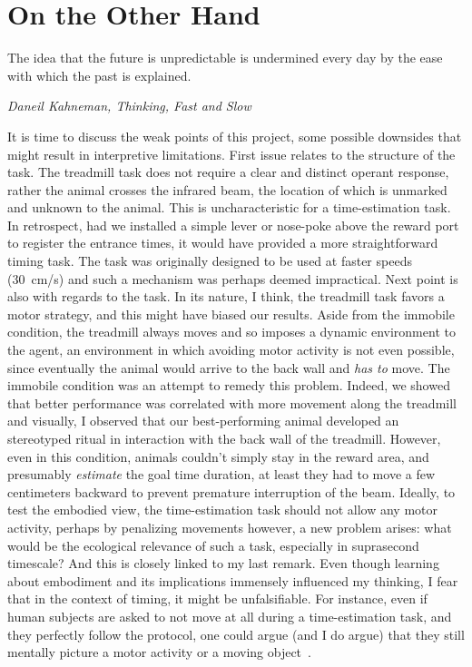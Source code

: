 \section{On the Other Hand}
{\singlespacing \epigraph{The idea that the future is unpredictable is undermined every day by the ease with which the past is explained.}
{\textit{Daneil Kahneman, Thinking, Fast and Slow}}}
\noindent
It is time to discuss the weak points of this project, some possible downsides that might result in interpretive limitations.
First issue relates to the structure of the task.
The treadmill task does not require a clear and distinct operant response, rather the animal crosses the infrared beam, the location of which is unmarked and unknown to the animal.
This is uncharacteristic for a time-estimation task.
In retrospect, had we installed a simple lever or nose-poke above the reward port to register the entrance times, it would have provided a more straightforward timing task.
The task was originally designed to be used at faster speeds (30~cm/s) and such a mechanism was perhaps deemed impractical.
Next point is also with regards to the task.
In its nature, I think, the treadmill task favors a motor strategy, and this might have biased our results.
Aside from the immobile condition, the treadmill always moves and so imposes a dynamic environment to the agent, an environment in which avoiding motor activity is not even possible, since eventually the animal would arrive to the back wall and \textit{has to} move.
The immobile condition was an attempt to remedy this problem.
Indeed, we showed that better performance was correlated with more movement along the treadmill and visually, I observed that our best-performing animal developed an stereotyped ritual in interaction with the back wall of the treadmill.
However, even in this condition, animals couldn't simply stay in the reward area, and presumably \textit{estimate} the goal time duration, at least they had to move a few centimeters backward to prevent premature interruption of the beam.
Ideally, to test the embodied view, the time-estimation task should not allow any motor activity, perhaps by penalizing movements however, a new problem arises:
what would be the ecological relevance of such a task, especially in suprasecond timescale?
And this is closely linked to my last remark.
Even though learning about embodiment and its implications immensely influenced my thinking, I fear that in the context of timing, it might be unfalsifiable.
For instance, even if human subjects are asked to not move at all during a time-estimation task, and they perfectly follow the protocol, one could argue (and I do argue) that they still mentally picture a motor activity or a moving object~\cite[also][]{Coull2018}.
